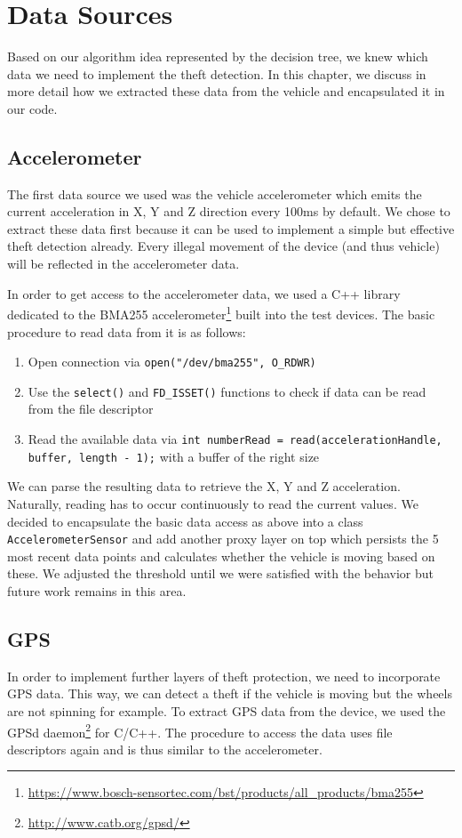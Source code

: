 \section{Data Sources}

Based on our algorithm idea represented by the decision tree, we knew which data we need to implement the theft detection. In this chapter, we discuss in more detail how we extracted these data from the vehicle and encapsulated it in our code.

\subsection{Accelerometer}
The first data source we used was the vehicle accelerometer which emits the current acceleration in X, Y and Z direction every 100ms by default. We chose to extract these data first because it can be used to implement a simple but effective theft detection already. Every illegal movement of the device (and thus vehicle) will be reflected in the accelerometer data.

In order to get access to the accelerometer data, we used a C++ library dedicated to the BMA255 accelerometer\footnote{\url{https://www.bosch-sensortec.com/bst/products/all_products/bma255}} built into the test devices. The basic procedure to read data from it is as follows:

\begin{enumerate}
	\item Open connection via \texttt{open("/dev/bma255", O\_RDWR)}
	\item Use the \texttt{select()} and \texttt{FD\_ISSET()} functions to check if data can be read from the file descriptor
	\item Read the available data via \texttt{int numberRead = read(accelerationHandle, buffer, length - 1);} with a buffer of the right size
\end{enumerate}

We can parse the resulting data to retrieve the X, Y and Z acceleration. Naturally, reading has to occur continuously to read the current values. We decided to encapsulate the basic data access as above into a class \texttt{AccelerometerSensor} and add another proxy layer on top which persists the 5 most recent data points and calculates whether the vehicle is moving based on these. We adjusted the threshold until we were satisfied with the behavior but future work remains in this area.

\subsection{GPS}
In order to implement further layers of theft protection, we need to incorporate GPS data. This way, we can detect a theft if the vehicle is moving but the wheels are not spinning for example. To extract GPS data from the device, we used the GPSd daemon\footnote{\url{http://www.catb.org/gpsd/}} for C/C++. The procedure to access the data uses file descriptors again and is thus similar to the accelerometer.


